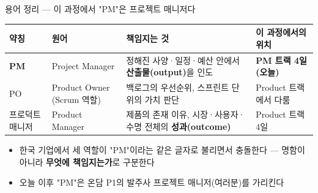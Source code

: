 \begin{frame}[allowframebreaks=1.0]{용어 정리 — 이 과정에서 "PM"은 프로젝트 매니저다}
\small
{\small\setlength{\tabcolsep}{3pt}\renewcommand{\arraystretch}{1.12}
\begin{tabular}{@{}>{\raggedright\arraybackslash}p{}>{\raggedright\arraybackslash}p{}>{\raggedright\arraybackslash}p{}>{\raggedright\arraybackslash}p{}@{}}
\toprule
\textbf{약칭} & \textbf{원어} & \textbf{책임지는 것} & \textbf{이 과정에서의 위치} \\
\midrule
\textbf{PM} & Project Manager & 정해진 사양·일정·예산 안에서 \textbf{산출물(output)}을 인도 & \textbf{PM 트랙 4일 (오늘)} \\
PO & Product Owner (Scrum 역할) & 백로그의 우선순위, 스프린트 단위의 가치 판단 & Product 트랙에서 다룸 \\
프로덕트 매니저 & Product Manager & 제품의 존재 이유, 시장·사용자·수명 전체의 \textbf{성과(outcome)} & Product 트랙 4일 \\
\bottomrule
\end{tabular}}
\par\smallskip
\begin{itemize}
\item\relax 한국 기업에서 세 역할이 "PM"이라는 같은 글자로 불리면서 충돌한다 — 명함이 아니라 \textbf{무엇에 책임지는가}로 구분한다
\item\relax 오늘 이후 "PM"은 온담 P1의 발주사 프로젝트 매니저(여러분)를 가리킨다
\end{itemize}
\end{frame}

